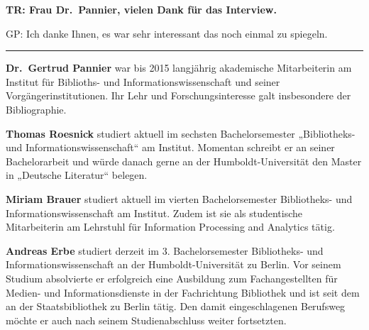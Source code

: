 \documentclass[a4paper,
fontsize=11pt,
oneside,
numbers=noperiodatend,
parskip=half-,
bibliography=totoc,
final
]{scrartcl}
\begin{document}
\textbf{TR: Frau Dr.~Pannier, vielen Dank für das Interview.}

GP: Ich danke Ihnen, es war sehr interessant das noch einmal zu
spiegeln.

\begin{center}\rule{0.5\linewidth}{\linethickness}\end{center}

\textbf{Dr.~Gertrud Pannier} war bis 2015 langjährig akademische
Mitarbeiterin am Institut für Biblioths- und Informationswissenschaft
und seiner Vorgängerinstitutionen. Ihr Lehr und Forschungsinteresse galt
insbesondere der Bibliographie.

\textbf{Thomas Roesnick} studiert aktuell im sechsten Bachelorsemester
„Bibliotheks- und Informationswissenschaft`` am Institut. Momentan
schreibt er an seiner Bachelorarbeit und würde danach gerne an der
Humboldt-Universität den Master in „Deutsche Literatur`` belegen.

\textbf{Miriam Brauer} studiert aktuell im vierten Bachelorsemester
Bibliotheks- und Informationswissenschaft am Institut. Zudem ist sie als
studentische Mitarbeiterin am Lehrstuhl für Information Processing and
Analytics tätig.

\textbf{Andreas Erbe} studiert derzeit im 3. Bachelorsemester
Bibliotheks- und Informationswissenschaft an der Humboldt-Universität zu
Berlin. Vor seinem Studium absolvierte er erfolgreich eine Ausbildung
zum Fachangestellten für Medien- und Informationsdienste in der
Fachrichtung Bibliothek und ist seit dem an der Staatsbibliothek zu
Berlin tätig. Den damit eingeschlagenen Berufsweg möchte er auch nach
seinem Studienabschluss weiter fortsetzten.
\end{document}
